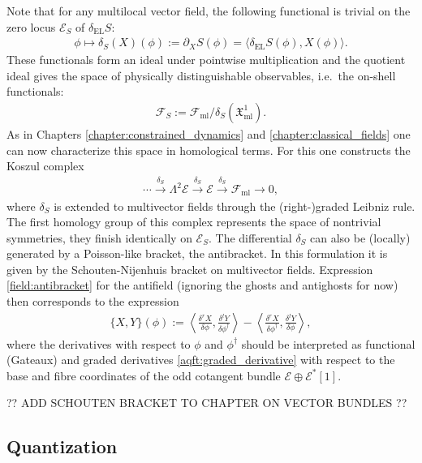     Note that for any multilocal vector field, the following functional is trivial on the zero locus $\mathcal{E}_S$ of $\delta_\mathrm{EL}S$:
    \begin{gather}
        \phi\mapsto\delta_S(X)(\phi):=\partial_XS(\phi)=\langle\delta_\mathrm{EL}S(\phi),X(\phi)\rangle.
    \end{gather}
    These functionals form an ideal under pointwise multiplication and the quotient ideal gives the space of physically distinguishable observables, i.e.~the on-shell functionals:
    \begin{gather}
        \mathcal{F}_S := \mathcal{F}_\mathrm{ml}/\delta_S(\mathfrak{X}^1_\mathrm{ml}).
    \end{gather}
    As in Chapters \ref{chapter:constrained_dynamics} and \ref{chapter:classical_fields} one can now characterize this space in homological terms. For this one constructs the Koszul complex
    \begin{gather}
        \cdots\overset{\delta_S}{\longrightarrow}\Lambda^2\mathcal{E}\overset{\delta_S}{\longrightarrow}\mathcal{E}\overset{\delta_S}{\longrightarrow}\mathcal{F}_\mathrm{ml}\longrightarrow0,
    \end{gather}
    where $\delta_S$ is extended to multivector fields through the (right-)graded Leibniz rule. The first homology group of this complex represents the space of nontrivial symmetries, they finish identically on $\mathcal{E}_S$. The differential $\delta_S$ can also be (locally) generated by a Poisson-like bracket, the antibracket. In this formulation it is given by the Schouten-Nijenhuis bracket on multivector fields. Expression \ref{field:antibracket} for the antifield (ignoring the ghosts and antighosts for now) then corresponds to the expression
    \begin{gather}
        \{X,Y\}(\phi) := \left\langle\frac{\delta^rX}{\delta\phi},\frac{\delta^lY}{\delta\phi^\dagger}\right\rangle - \left\langle\frac{\delta^rX}{\delta\phi^\dagger},\frac{\delta^lY}{\delta\phi}\right\rangle,
    \end{gather}
    where the derivatives with respect to $\phi$ and $\phi^\dagger$ should be interpreted as functional (Gateaux) and graded derivatives \ref{aqft:graded_derivative} with respect to the base and fibre coordinates of the odd cotangent bundle $\mathcal{E}\oplus\mathcal{E}^*[1]$.

    ?? ADD SCHOUTEN BRACKET TO CHAPTER ON VECTOR BUNDLES ??

\subsection{Quantization}

